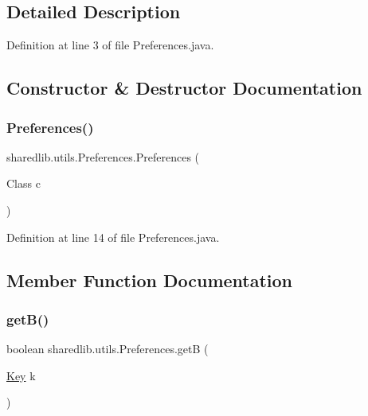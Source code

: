 \subsection{Detailed Description}


Definition at line 3 of file Preferences.\+java.



\subsection{Constructor \& Destructor Documentation}
\hypertarget{classsharedlib_1_1utils_1_1_preferences_a520e4e33760f9323ca369f46a4a24297}{}\label{classsharedlib_1_1utils_1_1_preferences_a520e4e33760f9323ca369f46a4a24297} 
\subsubsection{\texorpdfstring{Preferences()}{Preferences()}}
{\footnotesize\ttfamily sharedlib.\+utils.\+Preferences.\+Preferences (\begin{DoxyParamCaption}\item[{Class}]{c }\end{DoxyParamCaption})}



Definition at line 14 of file Preferences.\+java.



\subsection{Member Function Documentation}
\hypertarget{classsharedlib_1_1utils_1_1_preferences_a7859f4913ec148830aa827501fc5168a}{}\label{classsharedlib_1_1utils_1_1_preferences_a7859f4913ec148830aa827501fc5168a} 
\subsubsection{\texorpdfstring{get\+B()}{getB()}}
{\footnotesize\ttfamily boolean sharedlib.\+utils.\+Preferences.\+getB (\begin{DoxyParamCaption}\item[{\hyperlink{interfacesharedlib_1_1utils_1_1_preferences_1_1_key}{Key}}]{k }\end{DoxyParamCaption})}

